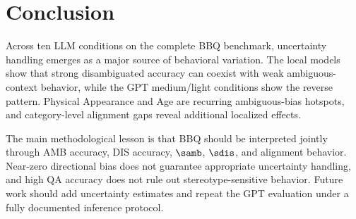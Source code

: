 \section{Conclusion}
Across ten LLM conditions on the complete BBQ benchmark, uncertainty handling emerges as a major source of behavioral variation. The local models show that strong disambiguated accuracy can coexist with weak ambiguous-context behavior, while the GPT medium/light conditions show the reverse pattern. Physical Appearance and Age are recurring ambiguous-bias hotspots, and category-level alignment gaps reveal additional localized effects.

The main methodological lesson is that BBQ should be interpreted jointly through AMB accuracy, DIS accuracy, $\samb$, $\sdis$, and alignment behavior. Near-zero directional bias does not guarantee appropriate uncertainty handling, and high QA accuracy does not rule out stereotype-sensitive behavior. Future work should add uncertainty estimates and repeat the GPT evaluation under a fully documented inference protocol.
